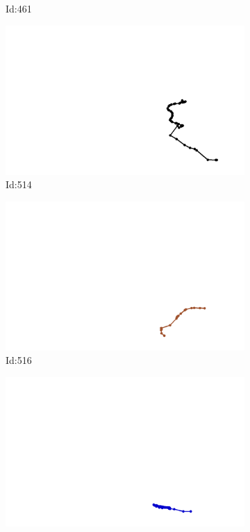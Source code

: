 \documentclass[12pt,twoside]{report}
\begin{document}
\begin{figure}
\begin{subfigure}[b]{0.20\textwidth}
\caption{Id:461}
\end{subfigure}
\begin{subfigure}[b]{0.20\textwidth}
\centering
\includegraphics[width=\textwidth]{../trajectories/514.png}
\caption{Id:514}
\end{subfigure}
\begin{subfigure}[b]{0.20\textwidth}
\centering
\includegraphics[width=\textwidth]{../trajectories/516.png}
\caption{Id:516}
\end{subfigure}
\begin{subfigure}[b]{0.20\textwidth}
\centering
\includegraphics[width=\textwidth]{../trajectories/539.png}

\end{subfigure}
\end{figure}
\end{document}
